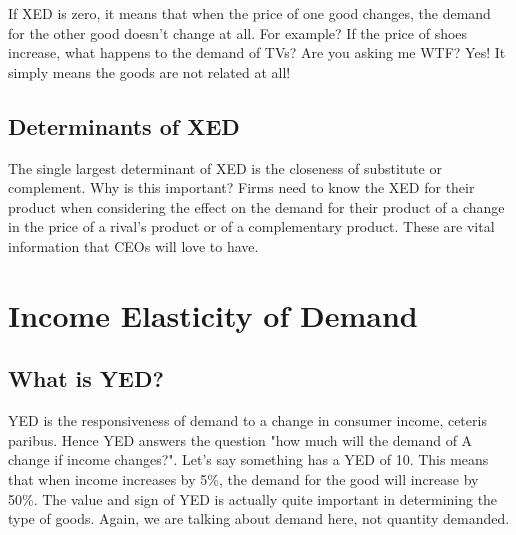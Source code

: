 If XED is zero, it means that when the price of one good changes, the demand for the other good doesn't change at all. For example? If the price of shoes increase, what happens to the demand of TVs? Are you asking me WTF? Yes! It simply means the goods are not related at all!
\subsection{Determinants of XED}
The single largest determinant of XED is the closeness of substitute or complement. Why is this important? Firms need to know the XED for their product when considering the effect on the demand for their product of a change in the price of a rival's product or of a complementary product. These are vital information that CEOs will love to have.
\newpage
\section{Income Elasticity of Demand}
\subsection{What is YED?}
YED is the responsiveness of demand to a change in consumer income, ceteris paribus. Hence YED answers the question "how much will the demand of A change if income changes?". Let's say something has a YED of 10. This means that when income increases by 5\%, the demand for the good will increase by 50\%. The value and sign of YED is actually quite important in determining the type of goods. Again, we are talking about demand here, not quantity demanded.
